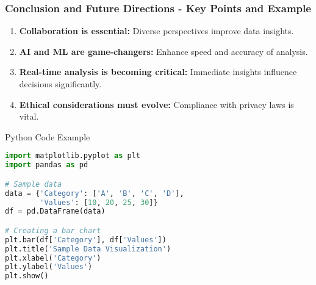\documentclass{beamer}
\begin{document}
\begin{frame}[fragile]
    \frametitle{Conclusion and Future Directions - Key Points and Example}
    \begin{enumerate}
        \item \textbf{Collaboration is essential:} Diverse perspectives improve data insights.
        \item \textbf{AI and ML are game-changers:} Enhance speed and accuracy of analysis.
        \item \textbf{Real-time analysis is becoming critical:} Immediate insights influence decisions significantly.
        \item \textbf{Ethical considerations must evolve:} Compliance with privacy laws is vital.
    \end{enumerate}
    
    \begin{block}{Python Code Example}
    \begin{lstlisting}[language=Python]
import matplotlib.pyplot as plt
import pandas as pd

# Sample data
data = {'Category': ['A', 'B', 'C', 'D'],
        'Values': [10, 20, 25, 30]}
df = pd.DataFrame(data)

# Creating a bar chart
plt.bar(df['Category'], df['Values'])
plt.title('Sample Data Visualization')
plt.xlabel('Category')
plt.ylabel('Values')
plt.show()
    \end{lstlisting}
    \end{block}
\end{frame}
\end{document}
